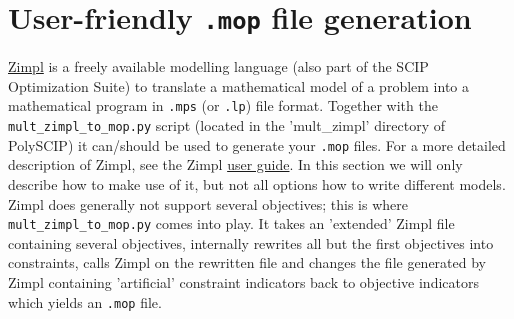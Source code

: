 \documentclass[11pt,listof=totoc]{scrartcl}
\theoremstyle{definition}
\begin{document}
\section{User-friendly \texttt{.mop} file generation}\label{sec-model}

\href{http://zimpl.zib.de}{Zimpl} is a freely available modelling
language (also part of the SCIP Optimization Suite) to translate a
mathematical model of a problem into a mathematical program in
\texttt{.mps} (or \texttt{.lp}) file format. Together with the
\texttt{mult\_zimpl\_to\_mop.py} script (located in the 'mult\_zimpl'
directory of PolySCIP) it can/should be used to generate your
\texttt{.mop} files. For a more detailed description of Zimpl, see the
Zimpl \href{http://zimpl.zib.de/download/zimpl.pdf}{user guide}. In
this section we will only describe how to make use of it, but not all
options how to write different models. Zimpl does generally not support several
objectives; this is where \texttt{mult\_zimpl\_to\_mop.py} comes into
play. It takes an 'extended' Zimpl file containing several objectives,
internally rewrites all but the first objectives into constraints,
calls Zimpl on the rewritten file and changes the file generated by Zimpl
containing 'artificial' constraint indicators back to objective
indicators which yields an \texttt{.mop} file.
\end{document}
